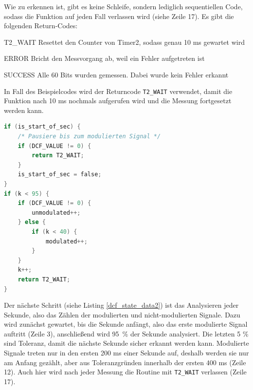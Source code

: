 Wie zu erkennen ist, gibt es keine Schleife, sondern lediglich sequentiellen Code, sodass die Funktion auf jeden Fall verlassen wird (siehe Zeile 17). Es gibt die folgenden Return-Codes:
%
\begin{list}{}
{\setlength{\topsep}{0cm}
\setlength{\itemsep}{0.2cm}
\setlength{\leftmargin}{3cm}
\setlength{\labelwidth}{3cm}
\setlength{\labelsep}{0cm}
\renewcommand{\makelabel}[1]{\textbf{\textsf{\normalsize #1} }}}
\item[T2\_WAIT] Resettet den Counter von Timer2, sodass genau 10 ms gewartet wird
\item[ERROR] Bricht den Messvorgang ab, weil ein Fehler aufgetreten ist
\item[SUCCESS] Alle 60 Bits wurden gemessen. Dabei wurde kein Fehler erkannt
\end{list}
%
%
%
%
In Fall des Beispielcodes wird der Returncode \texttt{T2\_WAIT} verwendet, damit die Funktion nach 10 ms nochmals aufgerufen wird und die Messung fortgesetzt werden kann.
%
\begin{lstlisting}[language=C,label=dcf_state_data2,caption=Empfang des DCF77 Signals - Sekunde analysieren]
if (is_start_of_sec) {
    /* Pausiere bis zum modulierten Signal */
    if (DCF_VALUE != 0) {
        return T2_WAIT;
    }
    is_start_of_sec = false;
}
if (k < 95) {
    if (DCF_VALUE != 0) {
        unmodulated++;
    } else {
        if (k < 40) {
            modulated++;
        }
    }
    k++;
    return T2_WAIT;
}
\end{lstlisting}
%
Der nächste Schritt (siehe Listing \ref{dcf_state_data2}) ist das Analysieren jeder Sekunde, also das Zählen der modulierten und nicht-modulierten Signale. Dazu wird zunächst gewartet, bis die Sekunde anfängt, also das erste modulierte Signal auftritt (Zeile 3), anschließend wird 95~\% der Sekunde analysiert. Die letzten 5 \% sind Toleranz, damit die nächste Sekunde sicher erkannt werden kann. Modulierte Signale treten nur in den ersten 200 ms einer Sekunde auf, deshalb werden sie nur am Anfang gezählt, aber aus Toleranzgründen innerhalb der ersten 400 ms (Zeile 12). Auch hier wird nach jeder Messung die Routine mit \texttt{T2\_WAIT} verlassen (Zeile 17).
